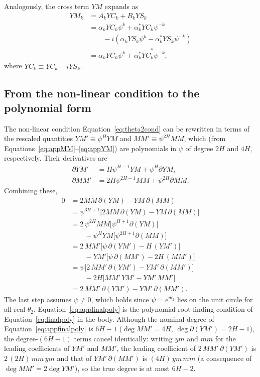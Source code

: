 \documentclass[apj]{emulateapj}
\newcommand{\YCt}{\widetilde{YC}}
\newcommand{\eith}{\psi}
\begin{document}
\begin{appendix}
Analogously, the cross term $YM$ expands as
\begin{align}\label{eq:appYM}
YM_{k} &= A_k YC_k + B_k YS_k \nonumber\\
       &= \alpha_k YC_k\eith^k + \alpha_k^{*} YC_k\eith^{-k} \nonumber\\
       &\qquad - i\left(\alpha_k YS_k\eith^k - \alpha^{*}_k YS_k\eith^{-k}\right) \nonumber\\
       &= \alpha_k\YCt_k \eith^k + \alpha^{*}_k\YCt_k^{*} \eith^{-k},
\end{align}
where $\YCt_k \equiv YC_k - i YS_k$.

\subsection{From the non-linear condition to the polynomial form}
\label{app:polynomialform}

The non-linear condition Equation~\ref{eq:theta2cond} can be
rewritten in terms of the rescaled quantities
$YM' \equiv \eith^H YM$ and $MM' \equiv \eith^{2H} MM$, which (from
Equations~\ref{eq:appMM}--\ref{eq:appYM}) are polynomials in $\eith$
of degree $2H$ and $4H$, respectively.  Their derivatives are
\begin{align}
\partial YM' &= H\eith^{H-1} YM + \eith^H \partial YM,\\
\partial MM' &= 2H\eith^{2H-1} MM + \eith^{2H}\partial MM.
\end{align}
Combining these,
\begin{align}\label{eq:appfinalpoly}
0 &= 2 MM\,\partial(YM) - YM\,\partial(MM) \nonumber\\
  &= \eith^{3H+1}\bigl[2 MM\,\partial(YM) - YM\,\partial(MM)\bigr] \nonumber\\
  &= 2\,\eith^{2H} MM\bigl[\eith^{H+1}\partial(YM)\bigr] \nonumber\\
  &\qquad - \eith^H YM\bigl[\eith^{2H+1}\partial(MM)\bigr] \nonumber\\
  &= 2\, MM'\bigl[\eith\,\partial(YM') - H\,(YM')\bigr] \nonumber\\
  &\qquad - YM'\bigl[\eith\,\partial(MM') - 2H\,(MM')\bigr] \nonumber\\
  &= \eith\bigl[2\, MM'\,\partial(YM') - YM'\,\partial(MM')\bigr] \nonumber\\
  &\qquad - 2H\bigl[MM'\,YM' - YM'\,MM'\bigr] \nonumber\\
  &= 2\, MM'\,\partial(YM') - YM'\,\partial(MM').
\end{align}
The last step assumes $\eith\ne 0$, which holds since
$\eith = e^{i\theta_2}$ lies on the unit circle for all real
$\theta_2$.  Equation~\ref{eq:appfinalpoly} is the polynomial
root-finding condition of Equation~\ref{eq:finalpoly} in the body.
Although the nominal degree of Equation~\ref{eq:appfinalpoly} is
$6H-1$ ($\deg MM' = 4H$, $\deg \partial(YM') = 2H-1$), the
degree-$(6H{-}1)$ terms cancel identically: writing $ym$ and $mm$ for
the leading coefficients of $YM'$ and $MM'$, the leading coefficient
of $2\,MM'\,\partial(YM')$ is $2\,(2H)\,mm\,ym$ and that of
$YM'\,\partial(MM')$ is $(4H)\,ym\,mm$ (a consequence of
$\deg MM' = 2 \deg YM'$), so the true degree is at most $6H-2$.


\end{appendix}
\end{document}
